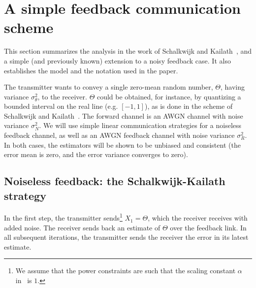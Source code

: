 \documentclass[conference]{IEEEtran}
\begin{document}



\section{A simple feedback communication scheme}
\label{sec:sk}
This section summarizes the analysis in the work of Schalkwijk and Kailath~\cite{S&K}, and a simple (and previously known) extension to a noisy feedback case. It also establishes the model and the notation used in the paper.

The transmitter wants to convey a single zero-mean random number, $\Theta$, having variance
$\sigma_\theta^2$, to the receiver. $\Theta$ could be obtained, for instance, by quantizing a bounded interval on the real line (e.g. $[-1,1]$), as is done in the scheme of Schalkwijk and Kailath~\cite{S&K}. The forward channel is an AWGN channel with noise variance $\sigma_N^2$. We will use simple linear communication strategies for a noiseless feedback channel, as well as an AWGN feedback channel with noise variance $\sigma_R^2$. In both cases, the estimators will be shown to be unbiased and consistent (the error mean is zero, and the error variance converges to zero).

\subsection{Noiseless feedback: the Schalkwijk-Kailath strategy}
 In the first step, the transmitter sends\footnote{We assume that the power constraints are such that the scaling constant $\alpha$ in~\cite{S&K} is $1$.} $X_1 = \Theta$, which the receiver receives with added noise. The receiver sends back an estimate of $\Theta$ over the feedback link. In all subsequent iterations, the transmitter sends the receiver the error in its latest estimate.
\end{document}
